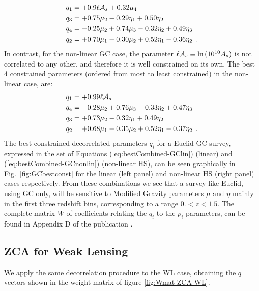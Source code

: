 \begin{equation} \label{eq:bestCombined-GClin}
\begin{aligned}
	q_1  &= +0.9 \ell \mathcal{A}_{s}  +  0.32 \mu_4 \\
	q_3  &= +0.75\mu_2 - 0.29\eta_1 + 0.50 \eta_2\\
	q_4  &= -0.25\mu_2 + 0.74\mu_3  - 0.32 \eta_2 + 0.49 \eta_3 \\
	q_2  &= +0.70\mu_1 - 0.30\mu_2  + 0.52 \eta_1 - 0.36 \eta_2 \,\,\, .
\end{aligned}
\end{equation}
In contrast, for the non-linear GC case, the parameter $\ell \mathcal{A}_{s} \equiv \ln{(10^{10}A_s)}$ is not correlated to any other, and therefore it 
is well constrained on its own. The best 4 constrained parameters (ordered from most to least constrained) in the non-linear case, are:
\begin{equation} \label{eq:bestCombined-GCnonlin}
\begin{aligned}
	q_1  &= +0.99\ell \mathcal{A}_{s} \\
	q_4  &= -0.28\mu_2 + 0.76\mu_3 -0.33 \eta_2 + 0.47 \eta_3\\
	q_3  &= +0.73\mu_2 -0.32 \eta_1 + 0.49 \eta_2\\
	q_2  &= +0.68\mu_1 -0.35\mu_2 + 0.52 \eta_1 -0.37 \eta_2 \,\,\, .
\end{aligned}
\end{equation}
The best constrained decorrelated parameters $q_i$ for a Euclid GC survey, 
expressed in the set of Equations (\ref{eq:bestCombined-GClin}) (linear) and (\ref{eq:bestCombined-GCnonlin}) (non-linear HS), 
can be seen graphically in Fig.\ \ref{fig:GCbestconst} for the linear (left panel) 
and non-linear HS (right panel) cases respectively. 
From these combinations we see that a survey like Euclid, using GC only, will be sensitive to Modified Gravity parameters $\mu$ and $\eta$ mainly in the first three redshift bins, corresponding to a range $0. < z < 1.5$.
The complete matrix $W$ of coefficients relating the $q_i$ to the $p_i$ parameters, 
can be found in Appendix D of the publication \cite{casas_linear_2017}.


\subsection{ZCA for Weak Lensing}

We apply the same decorrelation procedure to the WL case, obtaining the $q$ vectors
shown in the weight matrix of figure \ref{fig:Wmat-ZCA-WL}.

